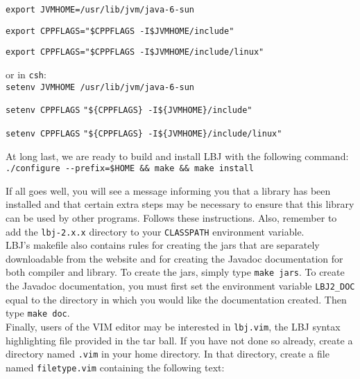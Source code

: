 \vspace{-.25cm}
{\tt export JVMHOME=/usr/lib/jvm/java-6-sun}

{\tt export CPPFLAGS="\$CPPFLAGS -I\$JVMHOME/include"}

{\tt export CPPFLAGS="\$CPPFLAGS -I\$JVMHOME/include/linux"} \\
\vspace{-.25cm}

\noindent
or in {\tt csh}: \\

\vspace{-.25cm}
{\tt setenv JVMHOME /usr/lib/jvm/java-6-sun}

{\tt setenv CPPFLAGS} \verb|"${CPPFLAGS} -I${JVMHOME}/include"|

{\tt setenv CPPFLAGS} \verb|"${CPPFLAGS} -I${JVMHOME}/include/linux"| \\
\vspace{-.25cm}

\noindent
At long last, we are ready to build and install LBJ with the following
command: \\

\vspace{-.25cm}
\verb|./configure --prefix=$HOME && make && make install| \\
\vspace{-.25cm}

\noindent
If all goes well, you will see a message informing you that a library has been
installed and that certain extra steps may be necessary to ensure that this
library can be used by other programs.  Follows these instructions.  Also,
remember to add the {\tt lbj-2.x.x} directory to your {\tt CLASSPATH}
environment variable. \\

LBJ's makefile also contains rules for creating the jars that are separately
downloadable from the website and for creating the Javadoc documentation for
both compiler and library.  To create the jars, simply type {\tt make jars}.
To create the Javadoc documentation, you must first set the environment
variable {\tt LBJ2\_DOC} equal to the directory in which you would like the
documentation created.  Then type {\tt make doc}. \\

Finally, users of the VIM editor may be interested in {\tt lbj.vim}, the LBJ
syntax highlighting file provided in the tar ball.  If you have not done so
already, create a directory named {\tt .vim} in your home directory.  In that
directory, create a file named {\tt filetype.vim} containing the following
text: \\

